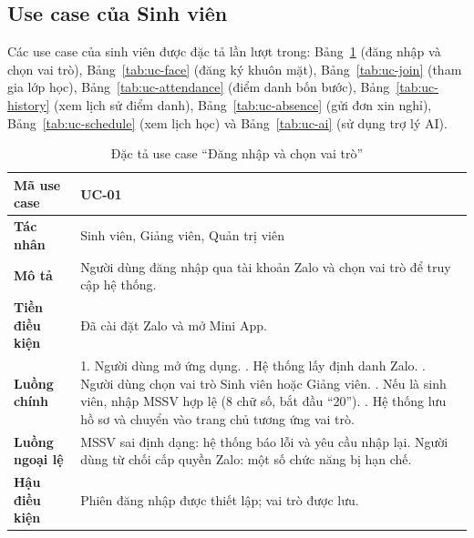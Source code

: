 \subsection{Use case của Sinh viên}

Các use case của sinh viên được đặc tả lần lượt trong: Bảng~\ref{tab:uc-login} (đăng nhập và
chọn vai trò), Bảng~\ref{tab:uc-face} (đăng ký khuôn mặt), Bảng~\ref{tab:uc-join} (tham gia
lớp học), Bảng~\ref{tab:uc-attendance} (điểm danh bốn bước), Bảng~\ref{tab:uc-history} (xem
lịch sử điểm danh), Bảng~\ref{tab:uc-absence} (gửi đơn xin nghỉ), Bảng~\ref{tab:uc-schedule}
(xem lịch học) và Bảng~\ref{tab:uc-ai} (sử dụng trợ lý AI).

\begin{table}[H]
\centering
\small
\caption{Đặc tả use case ``Đăng nhập và chọn vai trò''}
\label{tab:uc-login}
\begin{tabular}{|p{3cm}|p{10.6cm}|}
\hline
\textbf{Mã use case} & UC-01 \\ \hline
\textbf{Tác nhân} & Sinh viên, Giảng viên, Quản trị viên \\ \hline
\textbf{Mô tả} & Người dùng đăng nhập qua tài khoản Zalo và chọn vai trò để truy cập hệ thống. \\ \hline
\textbf{Tiền điều kiện} & Đã cài đặt Zalo và mở Mini App. \\ \hline
\textbf{Luồng chính} & 1. Người dùng mở ứng dụng. \newline 2. Hệ thống lấy định danh Zalo. \newline 3. Người dùng chọn vai trò Sinh viên hoặc Giảng viên. \newline 4. Nếu là sinh viên, nhập MSSV hợp lệ (8 chữ số, bắt đầu ``20''). \newline 5. Hệ thống lưu hồ sơ và chuyển vào trang chủ tương ứng vai trò. \\ \hline
\textbf{Luồng ngoại lệ} & MSSV sai định dạng: hệ thống báo lỗi và yêu cầu nhập lại. Người dùng từ chối cấp quyền Zalo: một số chức năng bị hạn chế. \\ \hline
\textbf{Hậu điều kiện} & Phiên đăng nhập được thiết lập; vai trò được lưu. \\ \hline
\end{tabular}
\end{table}


